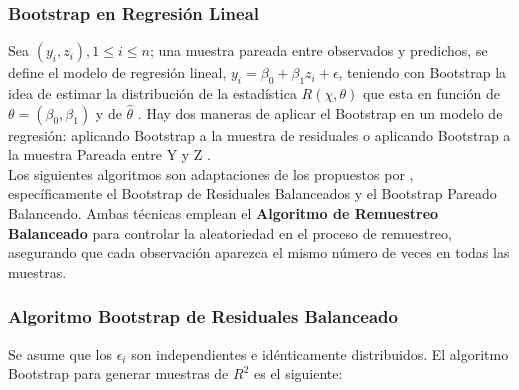 \subsubsection{Bootstrap en Regresión Lineal}

Sea $(y_{i}, z_{i}),  1 \leq  i \leq n$; una muestra pareada entre observados y predichos, se define el modelo de regresión lineal, $ y_{i} = \beta_{0} + \beta_{1}z_{i} +\epsilon $, teniendo con Bootstrap la idea de  estimar la distribución de la estadística $R( \chi, \theta)$ que esta en función de $\theta = (\beta_{0}, \beta_{1}) $ y de $\hat{\theta}$ \parencite{zacarias-2023}. Hay dos maneras de aplicar el Bootstrap
en un modelo de regresión: aplicando Bootstrap a la muestra de residuales o aplicando Bootstrap a la muestra Pareada entre Y y Z \parencite{balam-2012}.\\

Los siguientes algoritmos son adaptaciones de los propuestos por \textcite{balam-2012}, específicamente el Bootstrap de Residuales Balanceados y el Bootstrap Pareado Balanceado. Ambas técnicas emplean el \textbf{Algoritmo de Remuestreo Balanceado} para controlar la aleatoriedad en el proceso de remuestreo, asegurando que cada observación aparezca el mismo número de veces en todas las muestras.\\


\subsubsection{Algoritmo Bootstrap de Residuales Balanceado}

Se asume que los \( \epsilon_{i} \) son independientes e idénticamente distribuidos. El algoritmo Bootstrap para generar muestras de \( R^{2} \) es el siguiente:

